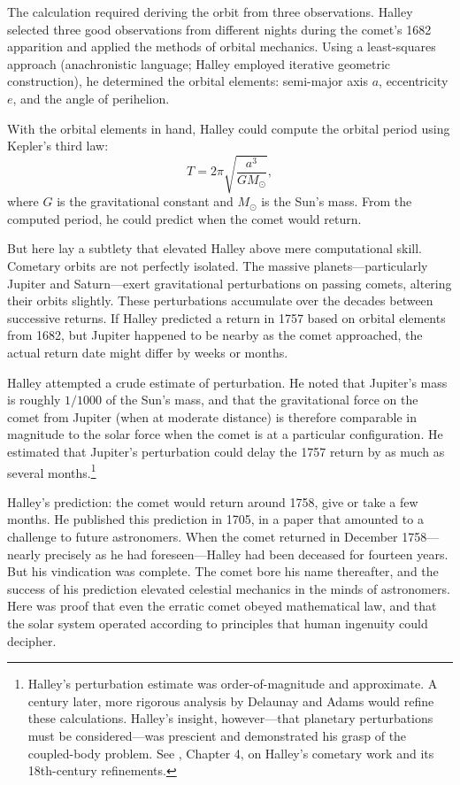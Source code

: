 The calculation required deriving the orbit from three observations. Halley selected three good observations from different nights during the comet's 1682 apparition and applied the methods of orbital mechanics. Using a least-squares approach (anachronistic language; Halley employed iterative geometric construction), he determined the orbital elements: semi-major axis $a$, eccentricity $e$, and the angle of perihelion.

With the orbital elements in hand, Halley could compute the orbital period using Kepler's third law:
\[
  T = 2\pi\sqrt{\frac{a^3}{GM_{\odot}}},
\]
where $G$ is the gravitational constant and $M_{\odot}$ is the Sun's mass. From the computed period, he could predict when the comet would return.

But here lay a subtlety that elevated Halley above mere computational skill. Cometary orbits are not perfectly isolated. The massive planets—particularly Jupiter and Saturn—exert gravitational perturbations on passing comets, altering their orbits slightly. These perturbations accumulate over the decades between successive returns. If Halley predicted a return in 1757 based on orbital elements from 1682, but Jupiter happened to be nearby as the comet approached, the actual return date might differ by weeks or months.

Halley attempted a crude estimate of perturbation. He noted that Jupiter's mass is roughly $1/1000$ of the Sun's mass, and that the gravitational force on the comet from Jupiter (when at moderate distance) is therefore comparable in magnitude to the solar force when the comet is at a particular configuration. He estimated that Jupiter's perturbation could delay the 1757 return by as much as several months.\footnote{Halley's perturbation estimate was order-of-magnitude and approximate. A century later, more rigorous analysis by Delaunay and Adams would refine these calculations. Halley's insight, however—that planetary perturbations must be considered—was prescient and demonstrated his grasp of the coupled-body problem. See \textcite{Hughes2000}, Chapter 4, on Halley's cometary work and its 18th-century refinements.}

Halley's prediction: the comet would return around 1758, give or take a few months. He published this prediction in 1705, in a paper that amounted to a challenge to future astronomers. When the comet returned in December 1758—nearly precisely as he had foreseen—Halley had been deceased for fourteen years. But his vindication was complete. The comet bore his name thereafter, and the success of his prediction elevated celestial mechanics in the minds of astronomers. Here was proof that even the erratic comet obeyed mathematical law, and that the solar system operated according to principles that human ingenuity could decipher.

